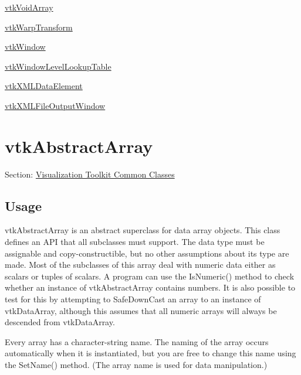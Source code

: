 \begin{DoxyItemize}
\item \hyperlink{vtkcommon_vtkvoidarray}{vtk\-Void\-Array}  
\item \hyperlink{vtkcommon_vtkwarptransform}{vtk\-Warp\-Transform}  
\item \hyperlink{vtkcommon_vtkwindow}{vtk\-Window}  
\item \hyperlink{vtkcommon_vtkwindowlevellookuptable}{vtk\-Window\-Level\-Lookup\-Table}  
\item \hyperlink{vtkcommon_vtkxmldataelement}{vtk\-X\-M\-L\-Data\-Element}  
\item \hyperlink{vtkcommon_vtkxmlfileoutputwindow}{vtk\-X\-M\-L\-File\-Output\-Window}  
\end{DoxyItemize}\hypertarget{vtkcommon_vtkabstractarray}{}\section{vtk\-Abstract\-Array}\label{vtkcommon_vtkabstractarray}
Section\-: \hyperlink{sec_vtkcommon}{Visualization Toolkit Common Classes} \hypertarget{vtkwidgets_vtkxyplotwidget_Usage}{}\subsection{Usage}\label{vtkwidgets_vtkxyplotwidget_Usage}
vtk\-Abstract\-Array is an abstract superclass for data array objects. This class defines an A\-P\-I that all subclasses must support. The data type must be assignable and copy-\/constructible, but no other assumptions about its type are made. Most of the subclasses of this array deal with numeric data either as scalars or tuples of scalars. A program can use the Is\-Numeric() method to check whether an instance of vtk\-Abstract\-Array contains numbers. It is also possible to test for this by attempting to Safe\-Down\-Cast an array to an instance of vtk\-Data\-Array, although this assumes that all numeric arrays will always be descended from vtk\-Data\-Array.

Every array has a character-\/string name. The naming of the array occurs automatically when it is instantiated, but you are free to change this name using the Set\-Name() method. (The array name is used for data manipulation.)


